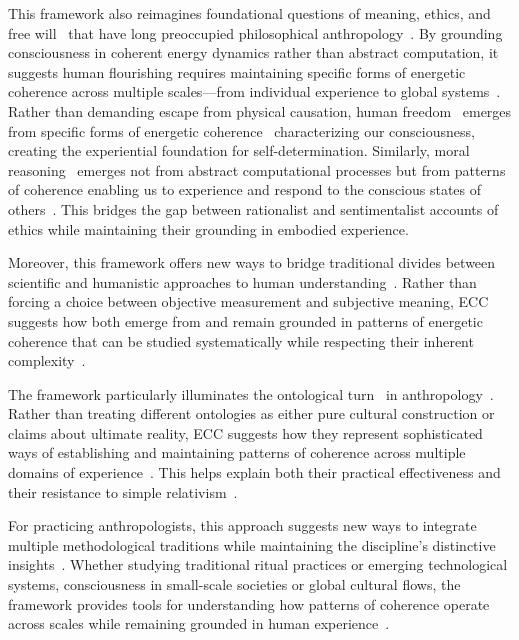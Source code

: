 This framework also reimagines foundational questions of meaning, ethics, and free will~ that have long preoccupied philosophical anthropology~\cite{Camus1955, Taylor1991}. By grounding consciousness in coherent energy dynamics rather than abstract computation, it suggests human flourishing requires maintaining specific forms of energetic coherence across multiple scales---from individual experience to global systems~\cite{Ricoeur1984, Sartre1956}. Rather than demanding escape from physical causation, human freedom~ emerges from specific forms of energetic coherence~ characterizing our consciousness, creating the experiential foundation for self-determination. Similarly, moral reasoning~ emerges not from abstract computational processes but from patterns of coherence enabling us to experience and respond to the conscious states of others~\cite{Taylor1991}. This bridges the gap between rationalist and sentimentalist accounts of ethics while maintaining their grounding in embodied experience.

Moreover, this framework offers new ways to bridge traditional divides between scientific and humanistic approaches to human understanding~\cite{stengers2018another, latour1999pandora}. Rather than forcing a choice between objective measurement and subjective meaning, ECC suggests how both emerge from and remain grounded in patterns of energetic coherence that can be studied systematically while respecting their inherent complexity~\cite{jackson1996things, laughlin1992brain}.

The framework particularly illuminates the ontological turn~ in anthropology~\cite{bessire2014ontological, viveiros2014cannibal}. Rather than treating different ontologies as either pure cultural construction or claims about ultimate reality, ECC suggests how they represent sophisticated ways of establishing and maintaining patterns of coherence across multiple domains of experience~\cite{kohn2013how}. This helps explain both their practical effectiveness and their resistance to simple relativism~\cite{strathern1980nature}.

For practicing anthropologists, this approach suggests new ways to integrate multiple methodological traditions while maintaining the discipline's distinctive insights~\cite{rabinow2008marking, fischer2018anthropology}. Whether studying traditional ritual practices or emerging technological systems, consciousness in small-scale societies or global cultural flows, the framework provides tools for understanding how patterns of coherence operate across scales while remaining grounded in human experience~\cite{pink2016digital}.

